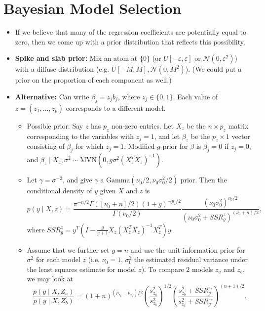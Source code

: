 \documentclass[twoside]{article}
\newcommand{\dis}{\displaystyle}
\newcommand\calN{\mathcal{N}}
\def\eps{\varepsilon}
\newcommand\sg{\sigma}
\begin{document}
\section{Bayesian Model Selection}
\begin{itemize}
\item If we believe that many of the regression coefficients are potentially equal to zero, then we come up with a prior distribution that reflects this possibility.

\item \textbf{Spike and slab prior:} Mix an atom at $\{ 0 \}$ (or $U[-\eps, \eps]$ or $\calN(0, \eps^2)$) with a diffuse distribution (e.g. $U[-M, M], \calN(0, M^2)$). (We could put a prior on the proportion of each component as well.)

\item \textbf{Alternative:} Can write $\beta_j = z_j b_j$, where $z_j \in \{ 0, 1\}$. Each value of $z = (z_1, \dots, z_p)$ corresponds to a different model.
\begin{itemize}
\item Possible prior: Say $z$ has $p_z$ non-zero entries. Let $X_z$ be the $n \times p_z$ matrix corresponding to the variables with $z_j = 1$, and let $\beta_z$ be the $p_z \times 1$ vector consisting of $\beta_j$ for which $z_j = 1$. Modified $g$-prior for $\beta$ is $\beta_j = 0$ if $z_j = 0$, and $\beta_z \mid X_z, \sg^2 \sim \text{MVN}(0, g\sg^2 (X_z^T X_z)^{-1})$.

\item Let $\gamma = \sg^{-2}$, and give $\gamma$ a $\text{Gamma}(\nu_0/2, \nu_0 \sg_0^2 / 2)$ prior. Then the conditional density of $y$ given $X$ and $z$ is
\[ p(y \mid X, z) = \frac{\pi^{-n/2}\Gamma([\nu_0 + n]/2)(1+g)^{-p_z/2}}{\Gamma(\nu_0/2)} \frac{(\nu_0 \sg_0^2)^{\nu_0/2}}{(\nu_0 \sg_0^2 + SSR_g^z)^{(\nu_0 + n)/2}}, \]
where $SSR_g^z = y^T \left(I - \dis\frac{g}{g+1}X_z(X_z^T X_z)^{-1} X_z^T \right)y$.

\item Assume that we further set $g = n$ and use the unit information prior for $\sg^2$ for each model $z$ (i.e. $\nu_0 = 1$, $\sg_0^2$ the estimated residual variance under the least squares estimate for model $z$). To compare 2 models $z_a$ and $z_b$, we may look at
\[ \frac{p(y \mid X, Z_a)}{p(y \mid X, Z_b)} = (1 + n)^{(p_{z_b} - p_{z_a})/2} \left(\frac{s_{z_a}^2}{s_{z_b}^2} \right)^{1/2} \left(\frac{s_{z_b}^2 + SSR_g^{z_b}}{s_{z_a}^2 + SSR_g^{z_a}} \right)^{(n+1)/2}. \]


\end{itemize}
\end{itemize}
\end{document}
